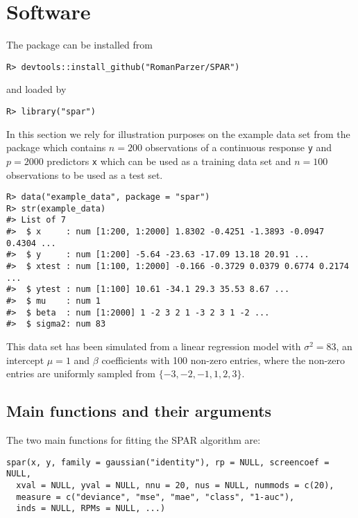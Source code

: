 \documentclass[
  article]{jss}
\begin{document}
\section{Software}\label{sec-software}

The package can be installed from 

\begin{verbatim}
R> devtools::install_github("RomanParzer/SPAR")
\end{verbatim}

and loaded by

\begin{verbatim}
R> library("spar")
\end{verbatim}

In this section we rely for illustration purposes on the example data
set from the package which contains \(n=200\) observations of a
continuous response \texttt{y} and \(p=2000\) predictors \texttt{x}
which can be used as a training data set and \(n=100\) observations to
be used as a test set.

\begin{verbatim}
R> data("example_data", package = "spar")
R> str(example_data)
#> List of 7
#>  $ x     : num [1:200, 1:2000] 1.8302 -0.4251 -1.3893 -0.0947 0.4304 ...
#>  $ y     : num [1:200] -5.64 -23.63 -17.09 13.18 20.91 ...
#>  $ xtest : num [1:100, 1:2000] -0.166 -0.3729 0.0379 0.6774 0.2174 ...
#>  $ ytest : num [1:100] 10.61 -34.1 29.3 35.53 8.67 ...
#>  $ mu    : num 1
#>  $ beta  : num [1:2000] 1 -2 3 2 1 -3 2 3 1 -2 ...
#>  $ sigma2: num 83
\end{verbatim}

This data set has been simulated from a linear regression model with
\(\sigma^2=83\), an intercept \(\mu=1\) and \(\beta\) coefficients with
100 non-zero entries, where the non-zero entries are uniformly sampled
from \(\{-3,-2,-1,1,2,3\}\).

\subsection{Main functions and their
arguments}\label{main-functions-and-their-arguments}

The two main functions for fitting the SPAR algorithm are:

\begin{verbatim}
spar(x, y, family = gaussian("identity"), rp = NULL, screencoef = NULL,
  xval = NULL, yval = NULL, nnu = 20, nus = NULL, nummods = c(20),
  measure = c("deviance", "mse", "mae", "class", "1-auc"),
  inds = NULL, RPMs = NULL, ...)
\end{verbatim}
\end{document}
